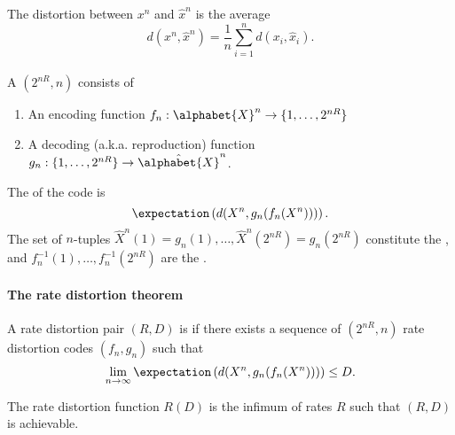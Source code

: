 \documentclass[a4paper, 11pt, openany]{book}
\begin{document}
\begin{figure}
\centering
{}
\end{figure}





The distortion between $x^n$ and $\hat{x}^n$ is the average
$$
	d(x^n, \hat{x}^n) = \frac{1}{n} \sum_{i=1}^n d(x_i, \hat{x}_i).
$$
~\\
A $(2^{nR},n)$  consists of
\begin{enumerate}
	\item An encoding function $f_n : \alphabet{X}^n \to \{1,\ldots,2^{nR}\}$

	\item A decoding (a.k.a. reproduction) function $g_n : \{1,\ldots,2^{nR}\} \to \hat{\alphabet{X}}^n $.
\end{enumerate}
The  of the code is
$$
	\expectation \left( d(X^n, g_n(f_n(X^n))) \right).
$$
The set of $n$-tuples $\hat{X}^n(1) = g_n(1), \ldots, \hat{X}^n(2^{nR}) = g_n(2^{nR})$  constitute the , and $f_n^{-1}(1), \ldots, f_n^{-1}(2^{nR})$ are the .




\paragraph{The rate distortion theorem}
A rate distortion pair $(R,D)$ is  if there exists a sequence of $(2^{nR},n)$ rate distortion codes $(f_n,g_n)$ such that
$$
	\lim_{n \to \infty} \expectation \left( d( X^n, g_n(f_n(X^n))) \right) \le D.
$$

\begin{theorem}
The rate distortion function $R(D)$ is the infimum of rates $R$ such that $(R,D)$ is achievable.
\end{theorem}
\end{document}
